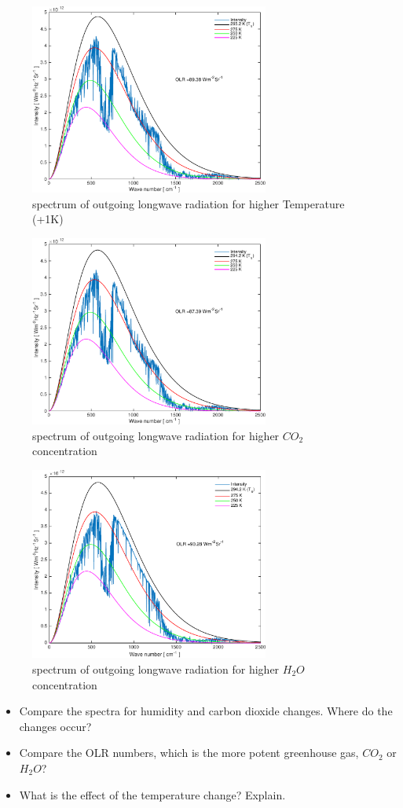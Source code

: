 \documentclass[paper=a4, fontsize=11pt]{scrartcl} %
\numberwithin{figure}{section}
\begin{document}
\begin{figure}[H]
\centering
	\includegraphics[width=0.7\textwidth]{plots/olr_+T.pdf}
	\caption{spectrum of outgoing longwave radiation for higher Temperature (+1K)}
\end{figure}

\begin{figure}[H]
\centering
	\includegraphics[width=0.7\textwidth]{plots/olr_+CO2.pdf}
	\caption{spectrum of outgoing longwave radiation for higher $CO_{2}$ concentration}
\end{figure}

\begin{figure}[H]
\centering
	\includegraphics[width=0.7\textwidth]{plots/olr_+H2O.pdf}
	\caption{spectrum of outgoing longwave radiation for higher $H_{2}O$ concentration}
\end{figure}

\begin{itemize}
	\item Compare the spectra for humidity and carbon dioxide changes. Where do the changes occur?
	\item Compare the OLR numbers, which is the more potent greenhouse gas, $CO_{2}$ or $H_{2}O$?
	\item What is the effect of the temperature change? Explain.
\end{itemize}
\end{document}
